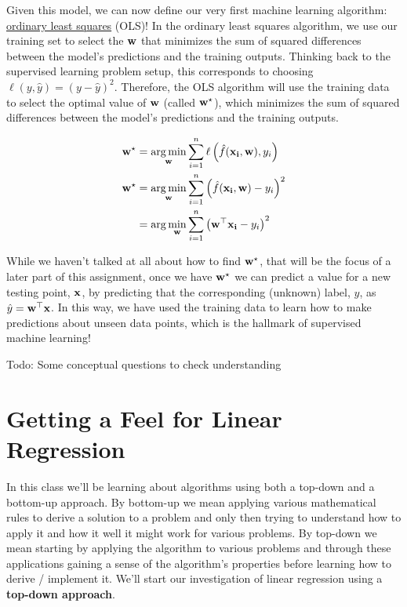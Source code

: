 \documentclass[assignment01_Solutions]{subfiles}
\begin{document}
Given this model, we can now define our very first machine learning algorithm: \href{https://en.wikipedia.org/wiki/Ordinary_least_squares}{ordinary least squares} (OLS)!  In the ordinary least squares algorithm, we use our training set to select the $\mathbf{w}$ that minimizes the sum of squared differences between the model's predictions and the training outputs.  Thinking back to the supervised learning problem setup, this corresponds to choosing $\ell(y, \hat{y}) = (y - \hat{y})^2$.
Therefore, the OLS algorithm will use the training data to select the optimal value of $\mathbf{w}$ (called $\mathbf{w}^\star$), which minimizes the sum of squared differences between the model's predictions and the training outputs.

\begin{align}
\mathbf{w}^\star &= \operatorname*{arg\,min}_{\mathbf{w}} \sum_{i=1}^n \ell \left ( \hat{f}(\mathbf{x_i}, \mathbf{w}) , y_i \right) \\
\mathbf{w}^\star &= \operatorname*{arg\,min}_{\mathbf{w}} \sum_{i=1}^n \left ( \hat{f}(\mathbf{x_i}, \mathbf{w}) - y_i \right)^2 \\
&= \arg\min_{\mathbf{w}} \sum_{i=1}^n \left ( \mathbf{w}^\top \mathbf{x_i} - y_i \right)^2
\end{align}

While we haven't talked at all about how to find $\mathbf{w}^\star$, that will be the focus of a later part of this assignment, once we have $\mathbf{w}^\star$ we can predict a value for a new testing point, $\mathbf{x}$, by predicting that the corresponding (unknown) label, $y$, as $\hat{y} = \mathbf{w}^\top \mathbf{x}$.  In this way, we have used the training data to learn how to make predictions about unseen data points, which is the hallmark of supervised machine learning!

\begin{exercise}
Todo: Some conceptual questions to check understanding
\end{exercise}

\section{Getting a Feel for Linear Regression}
In this class we'll be learning about algorithms using both a top-down and a bottom-up approach.  By bottom-up we mean applying various mathematical rules to derive a solution to a problem and only then trying to understand how to apply it and how it well it might work for various problems.  By top-down we mean starting by applying the algorithm to various problems and through these applications gaining a sense of the algorithm's properties before learning how to derive / implement it.  We'll start our investigation of linear regression using a \textbf{top-down approach}.
\end{document}
